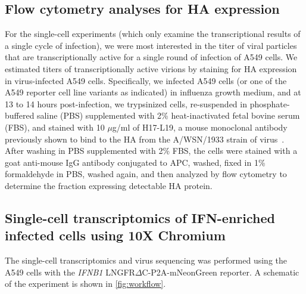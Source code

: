 \documentclass[10pt,letterpaper]{article}
\newcommand{\FIG}[1]{\autoref{fig:#1}}
\begin{document}
\subsection*{Flow cytometry analyses for HA expression}
For the single-cell experiments (which only examine the transcriptional results of a single cycle of infection), we were most interested in the titer of viral particles that are transcriptionally active for a single round of infection of A549 cells.
We estimated titers of transcriptionally active virions by staining for HA expression in virus-infected A549 cells.
Specifically, we infected A549 cells (or one of the A549 reporter cell line variants as indicated) in influenza growth medium, and at 13 to 14 hours post-infection, we trypsinized cells, re-suspended in phosphate-buffered saline (PBS) supplemented with 2\% heat-inactivated fetal bovine serum (FBS), and stained with 10 $\mu$g/ml of H17-L19, a mouse monoclonal antibody previously shown to bind to the HA from the A/WSN/1933 strain of virus~\citep{doud2017complete}.
After washing in PBS supplemented with 2\% FBS, the cells were stained with a goat anti-mouse IgG antibody conjugated to APC, washed, fixed in 1\% formaldehyde in PBS, washed again, and then analyzed by flow cytometry to determine the fraction expressing detectable HA protein.

\subsection*{Single-cell transcriptomics of IFN-enriched infected cells using 10X Chromium}
The single-cell transcriptomics and virus sequencing was performed using the A549 cells with the \textit{IFNB1} LNGFR$\Delta$C-P2A-mNeonGreen reporter.
A schematic of the experiment is shown in \FIG{workflow}.
\end{document}
